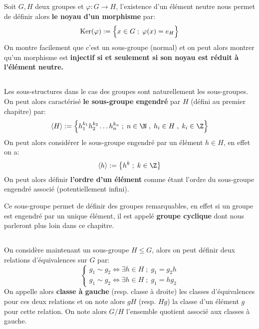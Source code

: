 \subsection*{}
Soit \(G, H\) deux groupes et \(\varphi: G \rightarrow H\), l'existence d'un élément neutre nous permet de définir alors \textbf{le noyau d'un morphisme} par:
\[
   \text{Ker}(\varphi) := \Bigl\{ x \in G \; ; \; \varphi(x) = e_H \Bigl\}
\]
On montre facilement que c'est un sous-groupe (normal) et on peut alors montrer qu'un morphisme est \textbf{injectif si et seulement si son noyau est réduit à l'élément neutre.} 
\subsection*{}
Les sous-structures dans le cas des groupes sont naturellement les sous-groupes. On peut alors caractérisé \textbf{le sous-groupe engendré} par \(H\) (défini au premier chapitre) par:
\[ 
   \langle H \rangle := \Bigl\{ h_1^{k_1}h_2^{k_2} \ldots h_n^{k_n}\; ; \; n \in \N \; , \; h_i \in H \; , \; k_i \in \Z \Bigl\}
\]
On peut alors considérer le sous-groupe engendré par un élément \(h \in H\), en effet on a:
\[
   \langle h \rangle := \left\{ h^{k} \; ; \; k \in \Z \right\}
\]
On peut alors définir \textbf{l'ordre d'un élément} comme étant l'ordre du sous-groupe engendré associé (potentiellement infini).\<

Ce sous-groupe permet de définir des groupes remarquables, en effet si un groupe est engendré par un unique élément, il est appelé \textbf{groupe cyclique} dont nous parleront plus loin dans ce chapitre.
\pagebreak
\subsection*{}
On considère maintenant un sous-groupe \( H \leq G \), alors on peut définir deux relations d'équivalences sur \( G \) par:
\[ 
   \begin{cases}
      g_1 \sim g_2 \iff \exists h \in H \; ; \; g_1 = g_2h\\
      g_1 \sim g_2 \iff \exists h \in H \; ; \; g_1 = hg_2
   \end{cases}
\] 
On appelle alors \textbf{classe à gauche} (resp. classe à droite) les classes d'équivalences pour ces deux relations et on note alors \( gH \) (resp. \( Hg \)) la classe d'un élément \( g \) pour cette relation. On note alors \( G/H \) l'ensemble quotient associé aux classes à gauche.
